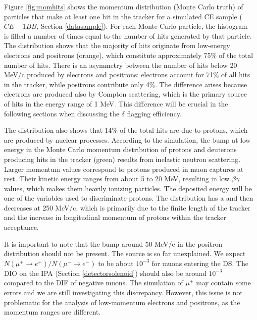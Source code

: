 Figure \ref{fig:momhits} shows the 
momentum distribution (Monte Carlo truth) of 
particles that make at least one hit in the 
tracker for a simulated CE sample ($CE-1BB$, 
Section \ref{datasample}). 
For each Monte Carlo particle, the 
histogram is filled a number of times 
equal to the number of hits generated 
by that particle.
The distribution shows that the 
majority of hits originate from 
low-energy electrons and positrons 
(orange), which constitute approximately 
75\% of the total number of hits. 
There is an asymmetry between the 
number of hits below 20 MeV/c 
produced by electrons and positrons: 
electrons account for 71\% of all hits in 
the tracker, while positrons contribute only 4\%. The difference  
arises because electrons are produced also by Compton scattering, which is 
the primary source of hits in the energy 
range of 1 MeV. This difference 
will be crucial in 
the following sections when discussing 
the $\delta$ flagging efficiency.

The distribution also shows that 14\% of 
the total hits are due to protons, 
which are produced by nuclear processes. 
According to the simulation, the bump at low energy in the Monte Carlo momentum 
distribution of protons and deuterons producing 
hits in the tracker (green) results from inelastic neutron scattering.
Larger momentum values correspond to protons produced in muon 
captures at rest. Their kinetic energy ranges from about 
5 to 20 MeV, resulting in low $\beta \gamma$ values, 
which makes them heavily ionizing particles. 
The deposited energy will be one of the variables used to discriminate protons. 
The distribution has a 
and then decreases at 250 MeV/c, which is 
primarily due to the finite length of the tracker and the increase in 
longitudinal momentum of protons within the tracker acceptance.

It is important to note that the bump 
around 50 MeV/c in the positron distribution should not be 
present. The source is so far unexplained. 
We expect $N(\mu^+ \rightarrow e^+ )/N(\mu^- \rightarrow e^- )$ 
to be about $10^{-3}$ for muons entering the DS. The DIO on the IPA 
(Section \ref{detectorsolenoid}) should also be around $10^{-3}$ compared to the DIF of 
negative muons. The simulation of $\mu^+$ may 
contain some errors and we are still 
investigating this discrepancy. However, this issue is not problematic for the analysis 
of low-momentum electrons and positrons, 
as the momentum ranges are different.

